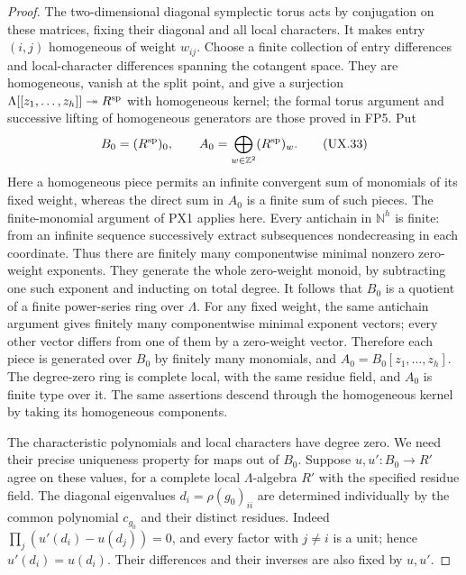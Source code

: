 \begin{proof}
The two-dimensional diagonal symplectic torus acts
by conjugation on these matrices, fixing their
diagonal and all local characters.  It makes entry
$(i,j)$ homogeneous of weight $w_{ij}$.
Choose a finite collection of entry differences
and local-character differences spanning the
cotangent space.  They are homogeneous, vanish
at the split point, and give a surjection
$\Lambda[[z_1,\ldots,z_h]]\twoheadrightarrow R^{\rm sp}$
with homogeneous kernel; the formal torus argument
and successive lifting of homogeneous generators
are those proved in FP5.  Put
\[
 B_0=(R^{\rm sp})_0,\qquad
 A_0=\bigoplus_{w\in\mathbb Z^2}(R^{\rm sp})_w.
 \tag{UX.33}
\]
Here a homogeneous piece permits an infinite convergent
sum of monomials of its fixed weight, whereas the
direct sum in $A_0$ is a finite sum of such pieces.
The finite-monomial argument of PX1 applies here.
Every antichain in $\mathbb N^h$ is finite: from
an infinite sequence successively extract subsequences
nondecreasing in each coordinate.  Thus there are
finitely many componentwise minimal nonzero
zero-weight exponents.  They generate the whole
zero-weight monoid, by subtracting one such exponent
and inducting on total degree.  It follows that
$B_0$ is a quotient of a finite power-series ring
over $\Lambda$.  For any fixed weight, the same
antichain argument gives finitely many componentwise
minimal exponent vectors;
every other vector differs from one of them by
a zero-weight vector.  Therefore each piece is
generated over $B_0$ by finitely many monomials,
and $A_0=B_0[z_1,\ldots,z_h]$.
The degree-zero ring is complete local, with the
same residue field, and $A_0$ is finite type over it.
The same assertions descend through the homogeneous
kernel by taking its homogeneous components.

The characteristic polynomials and local characters
have degree zero.  We need their precise uniqueness
property for maps out of $B_0$.  Suppose
$u,u':B_0\to R'$ agree on these values, for a
complete local $\Lambda$-algebra $R'$ with the
specified residue field.  The diagonal eigenvalues
$d_i=\rho(g_0)_{ii}$ are determined individually by
the common polynomial $c_{g_0}$ and their distinct
residues.  Indeed
$\prod_j(u'(d_i)-u(d_j))=0$, and every factor
with $j\ne i$ is a unit; hence $u'(d_i)=u(d_i)$.
Their differences and their inverses are also
fixed by $u,u'$.


\end{proof}

